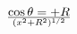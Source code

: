 \documentclass[preview]{standalone}
\begin{document}
\begin{align*}
\cos \theta = +  R} \over {(x^2 + R^2)^{1/2  }
\end{align*}
\end{document}
